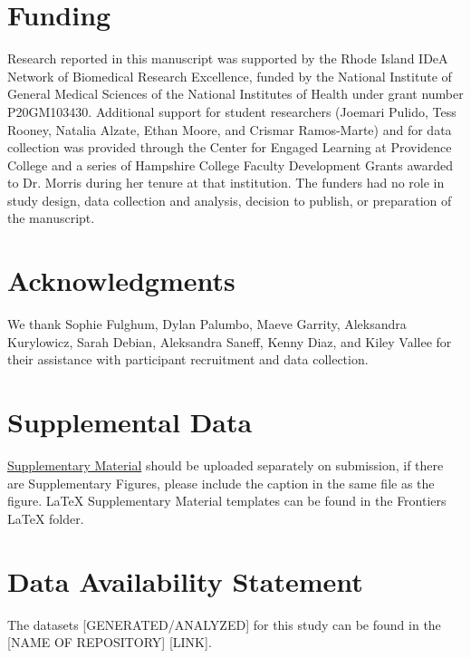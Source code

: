 \documentclass[utf8]{FrontiersinHarvard} %
\begin{document}
	\section*{Funding}
	Research reported in this manuscript was supported by the Rhode Island IDeA Network of Biomedical Research Excellence, funded by the National Institute of General Medical Sciences of the National Institutes of Health under grant number P20GM103430. Additional support for student researchers (Joemari Pulido, Tess Rooney, Natalia Alzate, Ethan Moore, and Crismar Ramos-Marte) and for data collection was provided through the Center for Engaged Learning at Providence College and a series of Hampshire College Faculty Development Grants awarded to Dr. Morris during her tenure at that institution. The funders had no role in study design, data collection and analysis, decision to publish, or preparation of the manuscript.
	
	
	\section*{Acknowledgments}
	We thank Sophie Fulghum, Dylan Palumbo, Maeve Garrity, Aleksandra Kurylowicz, Sarah Debian, Aleksandra Saneff, Kenny Diaz, and Kiley Vallee for their assistance with participant recruitment and data collection.
	
	\section*{Supplemental Data}
	\href{http://home.frontiersin.org/about/author-guidelines#SupplementaryMaterial}{Supplementary Material} should be uploaded separately on submission, if there are Supplementary Figures, please include the caption in the same file as the figure. LaTeX Supplementary Material templates can be found in the Frontiers LaTeX folder.
	
	\section*{Data Availability Statement}
	The datasets [GENERATED/ANALYZED] for this study can be found in the [NAME OF REPOSITORY] [LINK].
	
	
	
	
	
\end{document}
